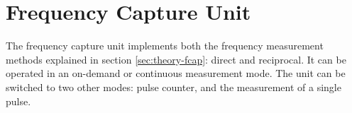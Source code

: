 
\section{Frequency Capture Unit}

The frequency capture unit implements both the frequency measurement methods explained in section \ref{sec:theory-fcap}: direct and reciprocal. It can be operated in an on-demand or continuous measurement mode. The unit can be switched to two other modes: pulse counter, and the measurement of a single pulse.
